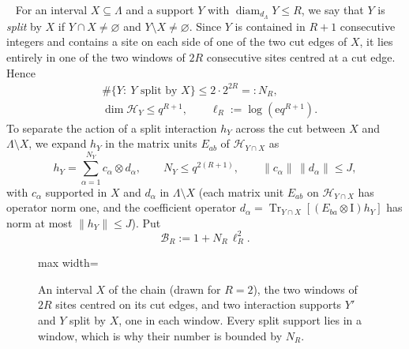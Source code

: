\documentclass[aps,prx,reprint,superscriptaddress,floatfix,nofootinbib,longbibliography,amsmath,amssymb]{revtex4-2}
\newcommand{\id}{\mathrm{I}}
\newcommand{\Tr}{\operatorname{Tr}}
\newcommand{\diam}{\operatorname{diam}}
\newcommand{\norm}[1]{\lVert #1\rVert}
\newcommand{\cH}{\mathcal H}
\newcommand{\cB}{\mathcal B}
\newcommand{\Lam}{\Lambda}
\newcommand{\e}{\mathrm e}
\theoremstyle{plain}
\theoremstyle{definition}
\newcommand{\precisely}{\par\noindent{\bfseries Precisely.}\ }
\begin{document}
\precisely
For an interval $X\subseteq\Lam$ and a support $Y$ with
$\diam_{d_\Lam}Y\le R$, we say that $Y$ is \emph{split} by $X$ if
$Y\cap X\ne\varnothing$ and $Y\setminus X\ne\varnothing$. Since $Y$ is
contained in $R+1$ consecutive integers and contains a site on each
side of one of the two cut edges of $X$, it lies entirely in one of the
two windows of $2R$ consecutive sites centred at a cut edge. Hence
\begin{equation}\label{eq:count}
\begin{split}
 &\#\{Y:\ Y\text{ split by }X\}\le 2\cdot 2^{2R}=:N_R,\\
 &\dim\cH_Y\le q^{R+1},\qquad
 \ell_R:=\log(\e q^{R+1}).
\end{split}
\end{equation}
To separate the action of a split interaction $h_Y$ across the cut between
$X$ and $\Lam\setminus X$, we expand $h_Y$ in the matrix units $E_{ab}$ of
$\cH_{Y\cap X}$ as
\begin{equation}\label{eq:matrixunits}
 h_Y=\sum_{\alpha=1}^{N_Y}c_\alpha\otimes d_\alpha,\qquad
 N_Y\le q^{2(R+1)},\qquad \norm{c_\alpha}\,\norm{d_\alpha}\le J,
\end{equation}
with $c_\alpha$ supported in $X$ and $d_\alpha$ in $\Lam\setminus X$
(each matrix unit $E_{ab}$ on $\cH_{Y\cap X}$ has operator norm one, and
the coefficient operator $d_\alpha=\Tr_{Y\cap X}[(E_{ba}\otimes\id)h_Y]$
has norm at most $\norm{h_Y}\le J$). Put
\begin{equation}\label{eq:BR}
 \cB_R:=1+N_R\,\ell_R^2 .
\end{equation}

\begin{figure}[t]
\centering
\begin{adjustbox}{max width=\linewidth}

\end{adjustbox}
\caption{An interval $X$ of the chain (drawn for $R=2$), the two windows of $2R$ sites centred on its cut edges, and two interaction supports $Y'$ and $Y$ split by $X$, one in each window. Every split support lies in a window, which is why their number is bounded by $N_R$.}\label{fig:chain-cuts}
\end{figure}
\end{document}
